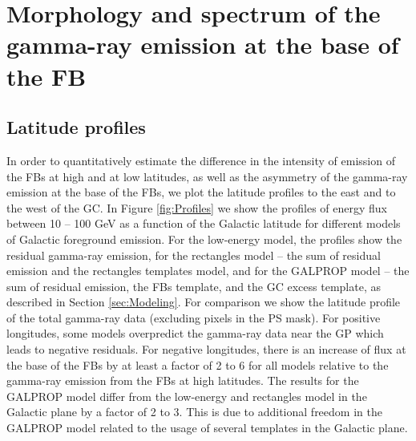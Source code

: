 \section{Morphology and spectrum of the gamma-ray emission at the base of the FB}


\subsection{Latitude profiles}
\label{sec:Latitude_profiles}

In order to quantitatively estimate the difference in the intensity of emission of the FBs at high and at low latitudes, as well as the asymmetry
of the gamma-ray emission at the base of the FBs,
we plot the latitude profiles to the east and to the west of the GC.
In Figure \ref{fig:Profiles} we show the profiles of energy flux between 10 -- 100 GeV as a function 
of the Galactic latitude for different models of Galactic foreground emission.
For the low-energy model, the profiles show the residual gamma-ray emission, 
for the rectangles model -- the sum of residual emission and the rectangles templates model, 
and for the GALPROP model --  the sum of residual emission, the FBs template, 
and the GC excess template, as described in Section \ref{sec:Modeling}. 
For comparison we show the latitude profile of the total gamma-ray data (excluding pixels in the PS mask).
For positive longitudes,
some models overpredict the gamma-ray data near the GP which leads to negative residuals.
For negative longitudes, there is an increase of flux at the base of the FBs 
by at least a factor of 2 to 6 for all models relative to the gamma-ray emission from the FBs at high latitudes. 
The results for the GALPROP model differ from the low-energy and rectangles model in the Galactic plane by a factor of 2 to 3. 
This is due to additional freedom in the GALPROP model related to the usage of several templates in the Galactic plane.


